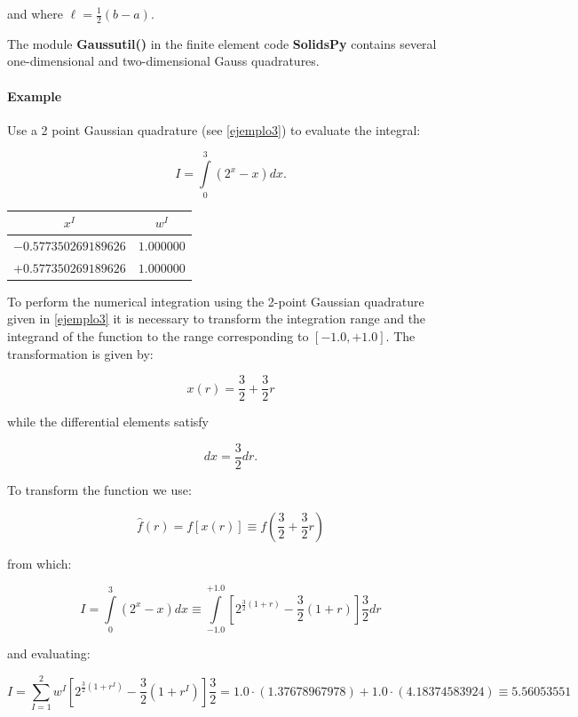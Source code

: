 and where $\ell= \frac{1}{2}(b - a).$

\begin{tcolorbox}
The module {\bf Gaussutil()} in the finite element code {\bf SolidsPy} contains several one-dimensional and two-dimensional Gauss quadratures.
\end{tcolorbox}


\paragraph*{Example}


Use a 2 point Gaussian quadrature (see \cref{ejemplo3}) to evaluate the integral:

\[I = \int\limits_0^3 {({2^x} - x)dx}. \]


\begin{center}
\begin{tabular}{cc}
  \hline
  $x^I$ & $w^I$ \\
  \hline 
  $-0.577350269189626$  &  $1.000000$  \\
  $+0.577350269189626$  & $1.000000$  \\
  \hline
\end{tabular}
\label{ejemplo3}
\end{center}

To perform the numerical integration using the 2-point Gaussian quadrature given in \cref{ejemplo3} it is necessary to transform the integration range and the integrand of the function to the range corresponding to $[-1.0,+1.0]$. The transformation is given by:

\[x(r) = \frac{3}{2} + \frac{3}{2}r\]

while the differential elements satisfy

\[dx = \frac{3}{2}dr.\]

To transform the function we use:

\[\hat f(r) = f[x(r)] \equiv f\left( {\frac{3}{2} + \frac{3}{2}r} \right)\]


from which:

\[I = \int\limits_0^3 {({2^x} - x)dx}  \equiv \int\limits_{ - 1.0}^{ + 1.0} {\left[ {{2^{\frac{3}{2}(1 + r)}} - \frac{3}{2}(1 + r)} \right]\frac{3}{2}dr} \]

and evaluating:

\[I = \sum\limits_{I = 1}^2 {{w^I}\left[ {{2^{\frac{3}{2}(1 + {r^I})}} - \frac{3}{2}(1 + {r^I})} \right]\frac{3}{2}}  = 1.0 \cdot (1.37678967978) + 1.0 \cdot (4.18374583924) \equiv 5.56053551\]

